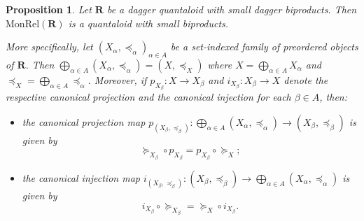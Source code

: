 \documentclass[12pt]{tac}
\newtheorem{proposition}[theorem]{Proposition}
\theoremstyle{definition}
\theoremstyle{remark}
\newcommand{\qo}{{\boldsymbol{\preccurlyeq}}}
\newcommand{\qop}{{\boldsymbol{\succcurlyeq}}}
\newcommand{\<}{\langle}
\renewcommand{\>}{\rangle}
\renewcommand{\:}{\colon}
\begin{document}
\begin{proposition}\label{prop:biproducts in MonRel}
    Let $\mathbf R$ be a dagger quantaloid with small dagger biproducts. Then $\mathrm{MonRel}(\mathbf R)$ is a quantaloid with small biproducts. 
    
    More specifically, let   $(X_\alpha,\qo_\alpha)_{\alpha\in A}$ be a set-indexed family of preordered objects of $\mathbf R$. Then $\bigoplus_{\alpha\in A}(X_\alpha,\qo_\alpha)=(X,\qo_X)$ where $X=\bigoplus_{\alpha\in A}X_\alpha$ and $\qo_X=\bigoplus_{\alpha\in A}\qo_\alpha$. Moreover, if $p_{X_\beta}:X\to X_\beta$ and $i_{X_\beta}:X_\beta\to X$ denote the respective canonical projection and the canonical injection for each $\beta\in A$, then:
    \begin{itemize}
        \item the canonical projection map $p_{(X_\beta,\qo_\beta)}:\bigoplus_{\alpha\in A}(X_\alpha,\qo_\alpha)\to(X_\beta,\qo_\beta)$ is given by 
        \begin{equation}\label{eq:p_ordered}
        \qop_{X_\beta}\circ p_{X_\beta}=p_{X_\beta}\circ\qop_X;    
        \end{equation}
        
        \item the canonical injection map $i_{(X_\beta,\qo_\beta)}:(X_\beta,\qo_\beta)\to\bigoplus_{\alpha\in A}(X_\alpha,\qo_\alpha)$ is given by 
        \begin{equation}\label{eq:i_ordered}
            i_{X_\beta}\circ\qop_{X_\beta}=\qop_X\circ i_{X_\beta}.
        \end{equation}
            \end{itemize}
\end{proposition}
\end{document}
